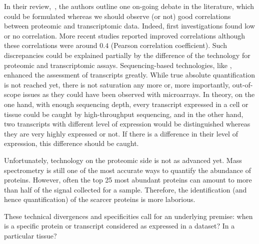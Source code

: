 In their review,~\citet{Uhlen:2016}, the authors outline one on-going debate
in the literature, which could be formulated whereas we should observe (or not)
good correlations between proteomic and transcriptomic data.
Indeed, first investigations found low or no correlation. More recent
studies reported improved correlations although these correlations were around
$0.4$ (Pearson correlation coefficient). Such discrepancies could be explained
partially by the difference of the technology for proteomic and transcriptomic
assays.
Sequencing-based technologies, like \Rnaseq,
enhanced the assessment of transcripts greatly.
While true absolute quantification is not reached yet,
there is not saturation any more or, more importantly, out-of-scope issues as
they could have been observed with microarrays. In theory, on the one hand, with
enough sequencing depth, every transcript expressed in a cell or tissue could be
caught by high-throughput sequencing, and in the other hand, two transcripts with
different level of expression would be distinguished whereas they are very highly
expressed or not. If there is a difference in their level of expression, this
difference should be caught.

Unfortunately, technology on the proteomic side is not as advanced yet.
Mass spectrometry is still one of the most accurate ways to quantify the
abundance of proteins. However, often the top 25 most abundant proteins can
amount to more than half of the signal collected for a sample. Therefore, the
identification (and hence quantification) of the scarcer proteins is more laborious.

These technical divergences and specificities call for an underlying premise:
when is a specific protein or transcript considered as expressed in a dataset?
In a particular tissue?

